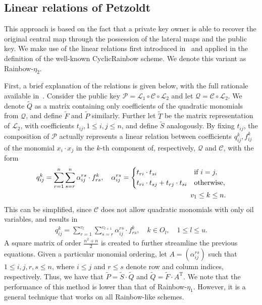 \documentclass[12pt, a4paper, oneside]{memoir}
\theoremstyle{definition}
\begin{document}
\subsection{Linear relations of Petzoldt}


This approach is based on the fact that a private key owner is able to recover the original central map through the possession of the lateral maps and the public key. We make use of the linear relations first introduced in~\cite{Petzoldt:201006} and applied in the definition of the well-known CyclicRainbow scheme. We denote this variant as Rainbow-$\eta_{2}$. 

First, a brief explanation of the relations is given below, with the full rationale available in~\cite[Chapter 7]{Petzoldt:201307}. Consider the public key
$\mathcal{P} = \mathcal{L}_{1} \circ \mathcal{C} \circ \mathcal{L}_{2}$ and let
$\mathcal{Q} = \mathcal{C} \circ \mathcal{L}_{2}$. We denote $\widetilde{Q}$ as a
matrix containing only coefficients of the quadratic monomials from
$\mathcal{Q}$, and define $\widetilde{F}$ and $\widetilde{P}$ similarly.
Further let $\widetilde{T}$ be the matrix representation of $\mathcal{L}_{2}$, with
coefficients $t_{ij}, 1 \leq i, j \leq n$, and define $\widetilde{S}$
analogously. By fixing $t_{ij}$, the composition of $\mathcal{P}$ actually
represents a linear relation between coefficients $q_{ij}^{k}, f_{ij}^{k}$ of
the monomial $x_{i} \cdot x_{j}$ in the $k$-th component of, respectively,
$\mathcal{Q}$ and $\mathcal{C}$, with the form
\begin{align}
  \begin{split}
    q_{ij}^{k} = \sum_{r = 1}^{n} \sum_{s = r}^{n}
      \alpha_{ij}^{rs} \cdot f_{rs}^{k}, \quad
      \alpha_{ij}^{rs} = 
      \begin{dcases}
        t_{ri} \cdot t_{si}                         & \text{if } i = j, \\
        t_{ri} \cdot t_{sj} + t_{rj} \cdot t_{si}   & \text{otherwise},
      \end{dcases} \\
      v_{1} \leq k \leq n.
  \end{split}
\end{align}
This can be simplified, since $\mathcal{C}$ does not allow quadratic monomials
with only oil variables, and results in
\begin{align}
  q_{ij}^{k} = \sum_{r = 1}^{v_{l}} \sum_{s = r}^{v_{l + 1}}
    \alpha_{ij}^{rs} \cdot f_{rs}^{k},
      \quad k \in O_{l}, \quad 1 \leq l \leq u.
\end{align}
A square matrix of order $\frac{n^{2} + n}{2}$ is created to further streamline
the previous equations. Given a particular monomial ordering, let
$A = (\alpha_{ij}^{rs})$ such that $1 \leq i, j, r, s \leq n$, where
$i \leq j$ and $r \leq s$ denote row and column indices, respectively. Thus, we
have that $\widetilde{P} = \widetilde{S} \cdot \widetilde{Q}$ and
$\widetilde{Q} = \widetilde{F} \cdot A^{\text{T}}$. We note that the
performance of this method is lower than that of Rainbow-$\eta_{1}$. However,
it is a general technique that works on all Rainbow-like schemes.
\end{document}
